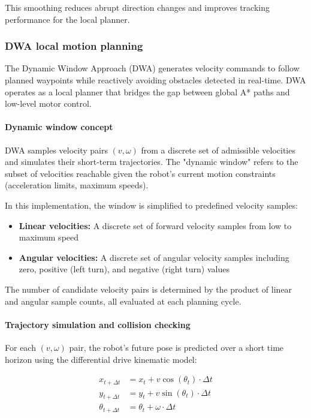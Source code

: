 \documentclass{article}
\begin{document}
This smoothing reduces abrupt direction changes and improves tracking performance for the local planner.

\subsubsection{DWA local motion planning}

The Dynamic Window Approach (DWA) generates velocity commands to follow planned waypoints while reactively avoiding obstacles detected in real-time. DWA operates as a local planner that bridges the gap between global A* paths and low-level motor control.

\paragraph{Dynamic window concept}

DWA samples velocity pairs $(v, \omega)$ from a discrete set of admissible velocities and simulates their short-term trajectories. The "dynamic window" refers to the subset of velocities reachable given the robot's current motion constraints (acceleration limits, maximum speeds).

In this implementation, the window is simplified to predefined velocity samples:
\begin{itemize}
    \item \textbf{Linear velocities:} A discrete set of forward velocity samples from low to maximum speed
    \item \textbf{Angular velocities:} A discrete set of angular velocity samples including zero, positive (left turn), and negative (right turn) values
\end{itemize}

The number of candidate velocity pairs is determined by the product of linear and angular sample counts, all evaluated at each planning cycle.

\paragraph{Trajectory simulation and collision checking}

For each $(v, \omega)$ pair, the robot's future pose is predicted over a short time horizon using the differential drive kinematic model:

$$
\begin{aligned}
x_{t+\Delta t} &= x_t + v \cos(\theta_t) \cdot \Delta t \\
y_{t+\Delta t} &= y_t + v \sin(\theta_t) \cdot \Delta t \\
\theta_{t+\Delta t} &= \theta_t + \omega \cdot \Delta t
\end{aligned}
$$
\end{document}
